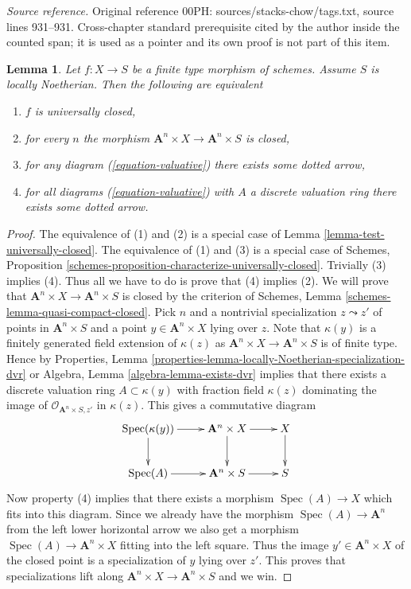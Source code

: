 \documentclass[10pt,a4paper]{amsart}
\theoremstyle{plain}
\newtheorem{lemma}[subsection]{Lemma}
\theoremstyle{definition}
\theoremstyle{remark}
\numberwithin{equation}{subsection}
\def\Spec{\mathop{\mathrm{Spec}}}
\begin{document}
\noindent\textit{Source reference.} Original reference 00PH: sources/stacks-chow/tags.txt, source lines 931--931. Cross-chapter standard prerequisite cited by the author inside the counted span; it is used as a pointer and its own proof is not part of this item.\par\medskip
\begin{lemma}
\label{lemma-check-universally-closed-Noetherian}
Let $f : X \to S$ be a finite type morphism of schemes.
Assume $S$ is locally Noetherian. Then the following are equivalent
\begin{enumerate}
\item $f$ is universally closed,
\item for every $n$ the morphism
$\mathbf{A}^n \times X \to \mathbf{A}^n \times S$ is closed,
\item for any diagram (\ref{equation-valuative}) there exists some
dotted arrow,
\item for all diagrams (\ref{equation-valuative}) with $A$ a discrete
valuation ring there exists some dotted arrow.
\end{enumerate}
\end{lemma}

\begin{proof}
The equivalence of (1) and (2) is a special case of
Lemma \ref{lemma-test-universally-closed}.
The equivalence of (1) and (3) is a special case of
Schemes, Proposition \ref{schemes-proposition-characterize-universally-closed}.
Trivially (3) implies (4).
Thus all we have to do is prove that (4) implies (2).
We will prove that $\mathbf{A}^n \times X \to \mathbf{A}^n \times S$
is closed by the criterion of
Schemes, Lemma \ref{schemes-lemma-quasi-compact-closed}.
Pick $n$ and a nontrivial specialization $z \leadsto z'$ of points
in $\mathbf{A}^n \times S$ and a point $y \in \mathbf{A}^n \times X$
lying over $z$. Note that $\kappa(y)$ is a finitely generated field
extension of $\kappa(z)$ as $\mathbf{A}^n \times X \to \mathbf{A}^n \times S$
is of finite type. Hence by
Properties, Lemma \ref{properties-lemma-locally-Noetherian-specialization-dvr}
or
Algebra, Lemma \ref{algebra-lemma-exists-dvr}
implies that there exists a discrete valuation ring $A \subset \kappa(y)$
with fraction field $\kappa(z)$ dominating the image of
$\mathcal{O}_{\mathbf{A}^n \times S, z'}$ in $\kappa(z)$.
This gives a commutative diagram
$$
\xymatrix{
\Spec(\kappa(y)) \ar[r] \ar[d] &
\mathbf{A}^n \times X \ar[d] \ar[r] & X \ar[d] \\
\Spec(A) \ar[r] & \mathbf{A}^n \times S \ar[r] & S
}
$$
Now property (4) implies that there exists a morphism
$\Spec(A) \to X$ which fits into this diagram.
Since we already have the morphism $\Spec(A) \to \mathbf{A}^n$
from the left lower horizontal arrow we also get a morphism
$\Spec(A) \to \mathbf{A}^n \times X$ fitting into the
left square. Thus the image $y' \in \mathbf{A}^n \times X$
of the closed point is a specialization of $y$ lying over $z'$.
This proves that specializations lift along
$\mathbf{A}^n \times X \to \mathbf{A}^n \times S$
and we win.
\end{proof}
\end{document}
